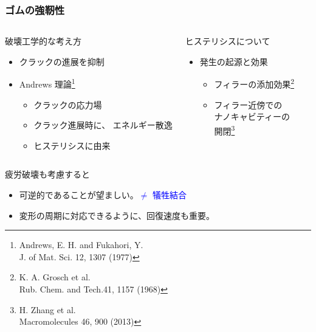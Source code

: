 \documentclass[12pt, dvipdfmx]{beamer}
\begin{document}
\begin{frame}[noframenumbering]
	\frametitle{ゴムの強靭性}
	\vspace{-3mm}
		\begin{columns}[totalwidth=\textwidth]
				\begin{exampleblock}{破壊工学的な考え方}
					\begin{itemize}
						\item クラックの進展を\alert{抑制}
						\item Andrews 理論\footnote{
							\scriptsize
				{Andrews, E. H. and Fukahori, Y. \\J. of Mat. Sci. 12, 1307 (1977)}
						}
							\begin{itemize}
								\item クラックの応力場
								\item クラック進展時に、{\color{red} エネルギー散逸}
								\item \alert{ヒステリシスに由来}
							\end{itemize}	
					\end{itemize}
				\end{exampleblock}
				
			\begin{block}{ヒステリシスについて}
				\begin{itemize}
					\item 発生の起源と効果
					\begin{itemize}
						\item フィラーの添加効果\footnote{
							\scriptsize{K. A. Grosch et al. \\Rub. Chem. and Tech.41, 1157 (1968)}
						}
						\item フィラー近傍での\\ナノキャビティーの\\開閉\footnote{
							\scriptsize{H. Zhang et al. \\Macromolecules 46, 900 (2013)}
						}
					\end{itemize}
				\end{itemize}
			\end{block}
		\end{columns}
		\begin{alertblock}{疲労破壊も考慮すると}
			\begin{itemize}
				\item \alert{可逆的}であることが望ましい。\textcolor{blue}{$\neq$ 犠牲結合}
				\item 変形の周期に対応できるように、\alert{回復速度}も重要。
			\end{itemize}
		\end{alertblock}
\end{frame}
\end{document}
